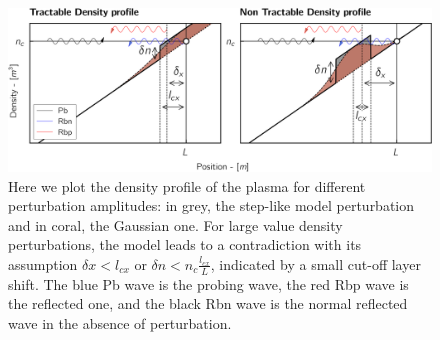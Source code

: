 \documentclass[11pt,openany]{report}
\begin{document}
\begin{figure}[H]
    \centering
    \hspace*{-0.8cm}\includegraphics[width = 1.03\linewidth]{./figures/density_profile.png}
    \caption{Here we plot the density profile of the plasma for different perturbation amplitudes: in grey, the step-like model perturbation and in coral, the Gaussian one. For large value density perturbations, the model leads to a contradiction with its assumption \(\delta x < l_{cx}\) or \(\delta n < n_c \frac{l_{cx}}{L}\), indicated by a small cut-off layer shift. The blue Pb wave is the probing wave, the red Rbp wave is the reflected one, and the black Rbn wave is the normal reflected wave in the absence of perturbation.}
    \label{Density_profile}
\end{figure}
\end{document}
